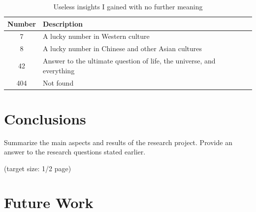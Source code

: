 \documentclass[a4paper,11pt,oneside]{article}
\begin{document}
  \begin{table}[ht]
    \begin{center}
      \begin{tabular}{cl}
        \toprule
        Number & Description \\
        \midrule
        7 & A lucky number in Western culture \\
        8 & A lucky number in Chinese and other Asian cultures \\
        42 & Answer to the ultimate question of life, the universe, and everything \\
        404 & Not found \\
        \bottomrule
      \end{tabular}
      \caption{Useless insights I gained with no further meaning}
    \end{center}
  \end{table}

  \section{Conclusions}

  Summarize the main aspects and results of the research
  project. Provide an answer to the research questions stated earlier.

  (target size: 1/2 page)

  \section{Future Work}

  \newpage

  \printbibliography
\end{document}
